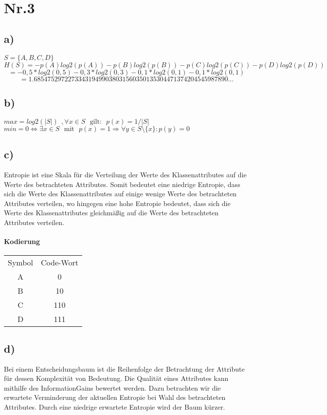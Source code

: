 \documentclass[a4paper,11pt,twoside]{article}
\begin{document}
\newpage

\section*{Nr.3}
\subsection*{a)}
$S = \{A,B,C,D\}$ 
\[ H(S) = -p(A)log2(p(A))-p(B)log2(p(B))-p(C)log2(p(C))-p(D)log2(p(D)) \]
\[ = -0,5*log2(0,5)-0,3*log2(0,3)-0,1*log2(0,1)-0,1*log2(0,1) \]
\[ = 1.685475297227334319499038031560350135304471374204545987890...\]

\subsection*{b)}
$max = log2(|S|)~~,\forall x \in S ~~~\text{gilt:}~~~ p(x) = 1/|S|$\\
$min = 0 \Leftrightarrow \exists x \in S ~~~\text{mit}~~~ p(x) = 1  \Rightarrow \forall y \in S \setminus \{x\} : p(y) = 0$

\subsection*{c)}
Entropie ist eine Skala für die Verteilung der Werte des Klassenattributes auf die Werte des betrachteten Attributes. Somit bedeutet eine niedrige Entropie, dass sich die Werte des Klassenattributes auf einige wenige Werte des betrachteten Attributes verteilen, wo hingegen eine hohe Entropie bedeutet, dass sich die Werte des Klassenattributes gleichmäßig auf die Werte des betrachteten Attributes verteilen.
\paragraph{Kodierung}
\begin{tabular}{cc}
	Symbol & Code-Wort \\
	A & 0\\
	B & 10\\
	C & 110\\
	D & 111
\end{tabular}

\subsection*{d)}
Bei einem Entscheidungsbaum ist die Reihenfolge der Betrachtung der Attribute für dessen Komplexität von Bedeutung. Die Qualität eines Attributes kann mithilfe des InformationGains bewertet werden. Dazu betrachten wir die erwartete Verminderung der aktuellen Entropie bei Wahl des betrachteten Attributes. Durch eine niedrige erwartete Entropie wird der Baum kürzer.
\end{document}
